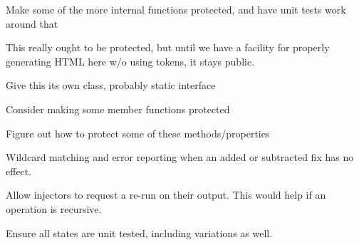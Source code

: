 \begin{DoxyRefList}
Make some of the more internal functions protected, and have unit tests work around that  
\item[\label{todo__todo000043}%
\hypertarget{todo__todo000043}{}%
Global \hyperlink{class_h_t_m_l_purifier___generator_aaec044ad490ceec21c6045191fe3a44b}{H\-T\-M\-L\-Purifier\-\_\-\-Generator\-:\-:escape} (\$string, \$quote=null)]This really ought to be protected, but until we have a facility for properly generating H\-T\-M\-L here w/o using tokens, it stays public.  
\item[\label{todo__todo000044}%
\hypertarget{todo__todo000044}{}%
Global \hyperlink{class_h_t_m_l_purifier___h_t_m_l_definition_ac2b2951ed767c9fbefefae6bce34f5c4}{H\-T\-M\-L\-Purifier\-\_\-\-H\-T\-M\-L\-Definition\-:\-:parse\-Tiny\-M\-C\-E\-Allowed\-List} (\$list)]Give this its own class, probably static interface  
\item[\label{todo__todo000047}%
\hypertarget{todo__todo000047}{}%
Class \hyperlink{class_h_t_m_l_purifier___h_t_m_l_module}{H\-T\-M\-L\-Purifier\-\_\-\-H\-T\-M\-L\-Module} ]Consider making some member functions protected  
\item[\label{todo__todo000045}%
\hypertarget{todo__todo000045}{}%
Class \hyperlink{class_h_t_m_l_purifier___h_t_m_l_module___tidy}{H\-T\-M\-L\-Purifier\-\_\-\-H\-T\-M\-L\-Module\-\_\-\-Tidy} ]Figure out how to protect some of these methods/properties  
\item[\label{todo__todo000046}%
\hypertarget{todo__todo000046}{}%
Global \hyperlink{class_h_t_m_l_purifier___h_t_m_l_module___tidy_a828b0511cf96443d7434ff0e31e652eb}{H\-T\-M\-L\-Purifier\-\_\-\-H\-T\-M\-L\-Module\-\_\-\-Tidy\-:\-:setup} (\$config)]Wildcard matching and error reporting when an added or subtracted fix has no effect.  
\item[\label{todo__todo000049}%
\hypertarget{todo__todo000049}{}%
Class \hyperlink{class_h_t_m_l_purifier___injector}{H\-T\-M\-L\-Purifier\-\_\-\-Injector} ]Allow injectors to request a re-\/run on their output. This would help if an operation is recursive.  
\item[\label{todo__todo000048}%
\hypertarget{todo__todo000048}{}%
Class \hyperlink{class_h_t_m_l_purifier___injector___auto_paragraph}{H\-T\-M\-L\-Purifier\-\_\-\-Injector\-\_\-\-Auto\-Paragraph} ]Ensure all states are unit tested, including variations as well. 


\end{DoxyRefList}
